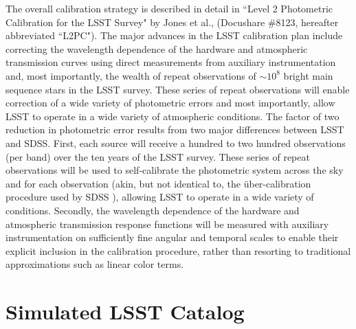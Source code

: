 \documentclass[12pt,preprint]{aastex}
\begin{document}
The overall calibration strategy is described in detail in ``Level 2
Photometric Calibration for the LSST Survey" by Jones et al.,
(Docushare \#8123, hereafter abbreviated ``L2PC"). The major advances
in the LSST calibration plan include correcting the wavelength
dependence of the hardware and atmospheric transmission curves using
direct measurements from auxiliary instrumentation and, most
importantly, the wealth of repeat observations of $\sim10^8$ bright
main sequence stars in the LSST survey. These series of repeat
observations will enable correction of a wide variety of photometric
errors and most importantly, allow LSST to operate in a wide variety
of atmospheric conditions.  The factor of two reduction in photometric
error results from two major differences between LSST and SDSS. First,
each source will receive a hundred to two hundred observations (per
band) over the ten years of the LSST survey. These series of repeat
observations will be used to self-calibrate the photometric system
across the sky and for each observation (akin, but not identical to,
the \"{u}ber-calibration procedure used by SDSS
\citep{pad08}), allowing LSST to operate in a wide variety
of conditions. Secondly, the wavelength dependence of the hardware and
atmospheric transmission response functions will be measured with
auxiliary instrumentation on sufficiently fine angular and temporal
scales to enable their explicit inclusion in the calibration
procedure, rather than resorting to traditional approximations such as
linear color terms.










\section{Simulated LSST Catalog}
\end{document}
